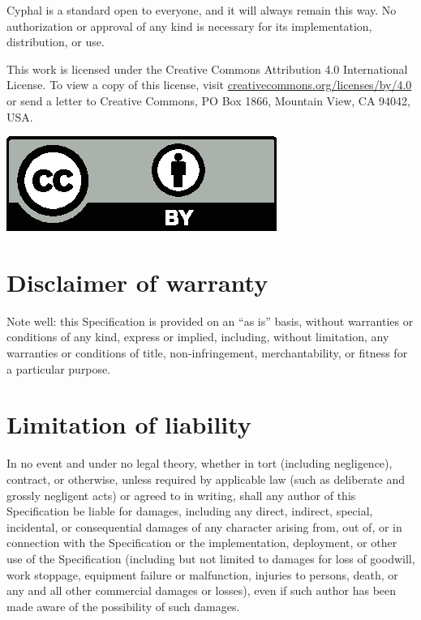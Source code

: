 \documentclass{cyphaldoc}
\begin{document}
\begin{titlepage}
Cyphal is a standard open to everyone, and it will always remain this way.
No authorization or approval of any kind is necessary for its implementation, distribution, or use.

This work is licensed under the Creative Commons Attribution 4.0 International License.
To view a copy of this license, visit
\href{http://creativecommons.org/licenses/by/4.0/}{creativecommons.org/licenses/by/4.0}
or send a letter to Creative Commons, PO Box 1866, Mountain View, CA 94042, USA.

\hspace*{\fill}\includegraphics[height=1.75\baselineskip]{cc-by}\hspace*{\fill}

\section*{Disclaimer of warranty}

Note well: this Specification is provided on an ``as is'' basis, without warranties or conditions of any kind,
express or implied, including, without limitation, any warranties or conditions of
title, non-infringement, merchantability, or fitness for a particular purpose.

\section*{Limitation of liability}

In no event and under no legal theory, whether in tort (including negligence), contract, or otherwise,
unless required by applicable law (such as deliberate and grossly negligent acts) or agreed to in writing,
shall any author of this Specification be liable for damages,
including any direct, indirect, special, incidental, or consequential damages of any character arising
from, out of, or in connection with the Specification or the implementation, deployment,
or other use of the Specification (including but not limited to damages for loss of goodwill,
work stoppage, equipment failure or malfunction, injuries to persons, death,
or any and all other commercial damages or losses),
even if such author has been made aware of the possibility of such damages.

\end{titlepage}

\tableofcontents
\clearpage\onecolumn\listoftables
\clearpage\onecolumn\listoffigures

\mainmatter







\end{document}
